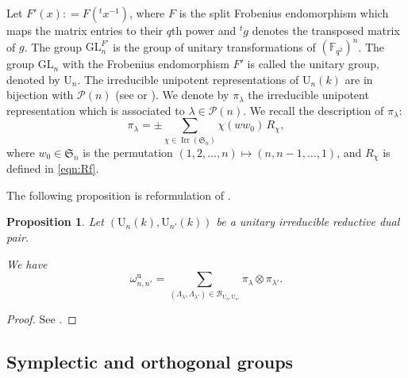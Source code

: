 \documentclass[12pt]{amsart}
\numberwithin{equation}{subsection}
\newtheorem{prop}[equation]{Proposition}
\newcommand{\FF}{\mathbb{F}}
\newcommand{\cP}{\mathcal{P}}
\newcommand{\rU}{\mathrm{U}}
\newcommand{\unip}{\mathrm{u}}
\newcommand{\Irr}{\operatorname{Irr}}
\newcommand{\fS}{\mathfrak{S}}
\newcommand{\GL}{\mathrm{GL}}
\def\cB{{\mathcal{B}}}
\begin{document}
Let $F'(x): =F({}^tx^{-1})$, where $F$ is the split Frobenius endomorphism which maps the matrix entries to their $q$th power and ${}^tg$ denotes the transposed matrix of $g$. 
The group $\GL_n^{F'}$ is the group of unitary transformations of $(\FF_{q^2})^n$. The group $\GL_n$ with the Frobenius endomorphism $F'$ is called the unitary group, denoted by $\rU_n$.
The irreducible unipotent representations of $\rU_n(k)$ are in bijection with $\cP(n)$ (see \cite[Corollary~2.4]{LS} or \cite[Theorem~11.7.2]{DMbook}). We denote by $\pi_\lambda$ the  irreducible unipotent representation which is associated to $\lambda\in\cP(n)$.
We recall the description of $\pi_\lambda$:
\begin{equation}
\pi_\lambda=\pm \sum_{\chi\in\Irr(\fS_n)}\chi(ww_0)\,R_\chi,
\end{equation}
where $w_0\in\fS_n$  is the permutation $(1, 2, \ldots, n) \mapsto (n, n -1, \ldots,1)$, and $R_\chi$ is defined in \eqref{eqn:Rf}.



The following proposition is reformulation of \cite[Th\'eor\`eme~3.10]{AMR}.
\begin{prop}
Let $(\rU_n(k),\rU_{n'}(k))$ be a unitary irreducible reductive dual pair. 

We have \[
\omega_{n,n'}^{\unip}=\sum_{(\Lambda_\lambda,\Lambda_{\lambda'})\in\cB_{\rU_{n},\rU_{n'}}}\pi_\lambda\otimes\pi_{\lambda'}.
\]
\end{prop}
\begin{proof}
See \cite[Proposition 3.1]{PanUU}.
\end{proof}



\subsection{Symplectic and orthogonal groups}\
\end{document}
